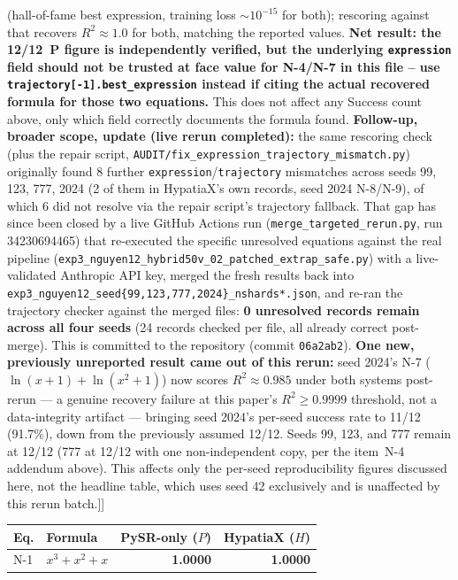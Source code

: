 \documentclass[twoside,11pt]{article}
\newcommand{\Rsq}{R^{2}}
\begin{document}
\begin{table}[h]
{{(hall-of-fame best expression, training loss $\sim 10^{-15}$ for both);
rescoring against that recovers $\Rsq\approx1.0$ for both, matching the
reported values. \textbf{Net result: the 12/12~P figure is independently
verified, but the underlying \texttt{expression} field should not be
trusted at face value for N-4/N-7 in this file -- use
\texttt{trajectory[-1].best\_expression} instead if citing the actual
recovered formula for those two equations.} This does not affect any
Success count above, only which field correctly documents the formula
found. \textbf{Follow-up, broader scope, update (live rerun completed):} the
same rescoring check (plus the repair script,
\texttt{AUDIT/fix\_expression\_trajectory\_mismatch.py}) originally found 8
further \texttt{expression}/\texttt{trajectory} mismatches across seeds 99,
123, 777, 2024 (2 of them in HypatiaX's own records, seed 2024 N-8/N-9), of
which 6 did not resolve via the repair script's trajectory fallback. That
gap has since been closed by a live GitHub Actions run
(\texttt{merge\_targeted\_rerun.py}, run 34230694465) that re-executed the
specific unresolved equations against the real pipeline
(\texttt{exp3\_nguyen12\_hybrid50v\_02\_patched\_extrap\_safe.py}) with a
live-validated Anthropic API key, merged the fresh results back into
\texttt{exp3\_nguyen12\_seed\{99,123,777,2024\}\_nshards*.json}, and
re-ran the trajectory checker against the merged files: \textbf{0
unresolved records remain across all four seeds} (24 records checked per
file, all already correct post-merge). This is committed to the repository
(commit \texttt{06a2ab2}). \textbf{One new, previously unreported result
came out of this rerun:} seed 2024's N-7
($\ln(x+1)+\ln(x^2+1)$) now scores $\Rsq \approx 0.985$ under both systems
post-rerun --- a genuine recovery failure at this paper's
$\Rsq\ge0.9999$ threshold, not a data-integrity artifact --- bringing
seed 2024's per-seed success rate to 11/12 (91.7\%), down from the
previously assumed 12/12. Seeds 99, 123, and 777 remain at 12/12 (777 at
12/12 with one non-independent copy, per the item~N-4 addendum above).
This affects only the per-seed reproducibility figures discussed here, not
the  headline table, which uses seed 42 exclusively and
is unaffected by this rerun batch.]}]}
\label{tab:nguyen12}
\begin{threeparttable}
\begin{tabular}{llrr}
\toprule
Eq. & Formula & PySR-only ($P$) & HypatiaX ($H$) \\
\midrule
N-1  & $x^3 + x^2 + x$                              & \textbf{1.0000} & \textbf{1.0000} \\

\end{tabular}
\end{threeparttable}
\end{table}
\end{document}
